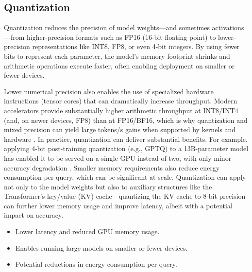 \subsection{Quantization}
Quantization reduces the precision of model weights---and sometimes activations---from higher-precision formats such as FP16 (16-bit floating point) to lower-precision representations like INT8, FP8, or even 4-bit integers. By using fewer bits to represent each parameter, the model’s memory footprint shrinks and arithmetic operations execute faster, often enabling deployment on smaller or fewer devices.

Lower numerical precision also enables the use of specialized hardware instructions (tensor cores) that can dramatically increase throughput. Modern accelerators provide substantially higher arithmetic throughput at INT8/INT4 (and, on newer devices, FP8) than at FP16/BF16, which is why quantization and mixed precision can yield large tokens/s gains when supported by kernels and hardware \cite{Dettmers2022LLMint8,Xiao2023SmoothQuant,NVIDIA2023Hopper}. In practice, quantization can deliver substantial benefits. For example, applying 4-bit post-training quantization (e.g., GPTQ) to a 13B-parameter model has enabled it to be served on a single GPU instead of two, with only minor accuracy degradation \cite{Frantar2023GPTQ}. Smaller memory requirements also reduce energy consumption per query, which can be significant at scale. Quantization can apply not only to the model weights but also to auxiliary structures like the Transformer’s key/value (KV) cache---quantizing the KV cache to 8-bit precision can further lower memory usage and improve latency, albeit with a potential impact on accuracy.

\begin{tcolorbox}[
  title={\textbf{Quantization: Pros}},
  colback=green!5,
  colframe=green!40!black,
  colbacktitle=green!20,
  coltitle=black,
  fonttitle=\bfseries,
  boxrule=0.7pt,
  arc=4pt,
  left=5mm, right=5mm, top=4mm, bottom=4mm,
  before skip=6pt,
  after skip=6pt
]
\begin{itemize}[leftmargin=1.5em, itemsep=3pt]
    \item Lower latency and reduced GPU memory usage.
    \item Enables running large models on smaller or fewer devices.
    \item Potential reductions in energy consumption per query.
\end{itemize}
\end{tcolorbox}


